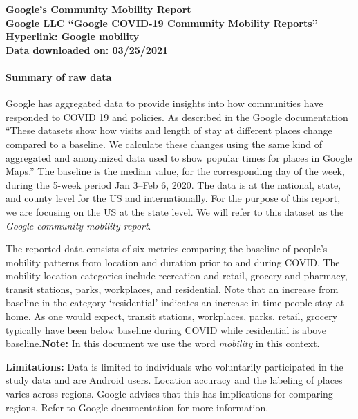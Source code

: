 \documentclass[
]{article}
\begin{document}
\textbf{{Google's Community Mobility Report }}\\
\textbf{Google LLC ``Google COVID-19 Community Mobility Reports''}\\
\textbf{Hyperlink:
\href{https://www.google.com/covid19/mobility/}{Google mobility} }\\
\textbf{Data downloaded on: 03/25/2021 }

\hypertarget{summary-of-raw-data-2}{%
\paragraph{\texorpdfstring{Summary of raw data\\
}{Summary of raw data }}\label{summary-of-raw-data-2}}

Google has aggregated data to provide insights into how communities have
responded to COVID 19 and policies. As described in the Google
documentation ``These datasets show how visits and length of stay at
different places change compared to a baseline. We calculate these
changes using the same kind of aggregated and anonymized data used to
show popular times for places in Google Maps.'' The baseline is the
median value, for the corresponding day of the week, during the 5-week
period Jan 3--Feb 6, 2020. The data is at the national, state, and
county level for the US and internationally. For the purpose of this
report, we are focusing on the US at the state level. We will refer to
this dataset as the \emph{Google community mobility report}.

The reported data consists of six metrics comparing the baseline of
people's mobility patterns from location and duration prior to and
during COVID. The mobility location categories include recreation and
retail, grocery and pharmacy, transit stations, parks, workplaces, and
residential. Note that an increase from baseline in the category
`residential' indicates an increase in time people stay at home. As one
would expect, transit stations, workplaces, parks, retail, grocery
typically have been below baseline during COVID while residential is
above baseline.\textbf{Note:} In this document we use the word
\emph{mobility} in this context.

\textbf{Limitations:} Data is limited to individuals who voluntarily
participated in the study data and are Android users. Location accuracy
and the labeling of places varies across regions. Google advises that
this has implications for comparing regions. Refer to Google
documentation for more information.
\end{document}

